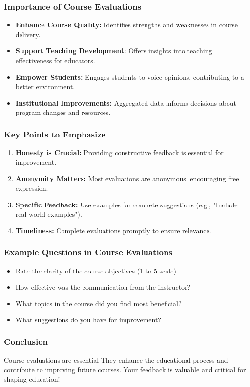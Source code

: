 \documentclass[aspectratio=169]{beamer}
\begin{document}
\begin{frame}[fragile]
    \frametitle{Importance of Course Evaluations}
    \begin{itemize}
        \item \textbf{Enhance Course Quality:} Identifies strengths and weaknesses in course delivery.
        \item \textbf{Support Teaching Development:} Offers insights into teaching effectiveness for educators.
        \item \textbf{Empower Students:} Engages students to voice opinions, contributing to a better environment.
        \item \textbf{Institutional Improvements:} Aggregated data informs decisions about program changes and resources.
    \end{itemize}
\end{frame}

\begin{frame}[fragile]
    \frametitle{Key Points to Emphasize}
    \begin{enumerate}
        \item \textbf{Honesty is Crucial:} Providing constructive feedback is essential for improvement.
        \item \textbf{Anonymity Matters:} Most evaluations are anonymous, encouraging free expression.
        \item \textbf{Specific Feedback:} Use examples for concrete suggestions (e.g., "Include real-world examples").
        \item \textbf{Timeliness:} Complete evaluations promptly to ensure relevance.
    \end{enumerate}
\end{frame}

\begin{frame}[fragile]
    \frametitle{Example Questions in Course Evaluations}
    \begin{itemize}
        \item Rate the clarity of the course objectives (1 to 5 scale).
        \item How effective was the communication from the instructor?
        \item What topics in the course did you find most beneficial?
        \item What suggestions do you have for improvement?
    \end{itemize}
\end{frame}

\begin{frame}[fragile]
    \frametitle{Conclusion}
    \begin{block}{Course evaluations are essential}
        They enhance the educational process and contribute to improving future courses. Your feedback is valuable and critical for shaping education!
    \end{block}
\end{frame}
\end{document}
